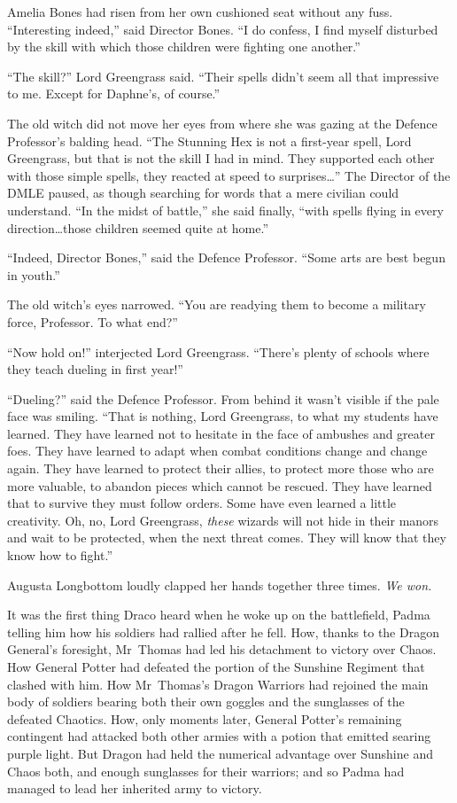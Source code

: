 Amelia Bones had risen from her own cushioned seat without any fuss.
“Interesting indeed,” said Director Bones. “I do confess, I find myself
disturbed by the skill with which those children were fighting one another.”

“The skill?” Lord Greengrass said. “Their spells didn’t seem all that
impressive to me. Except for Daphne’s, of course.”

The old witch did not move her eyes from where she was gazing at the Defence
Professor’s balding head. “The Stunning Hex is not a first-year spell, Lord
Greengrass, but that is not the skill I had in mind. They supported each other
with those simple spells, they reacted at speed to surprises…” The
Director of the DMLE paused, as though searching for words that a mere civilian
could understand. “In the midst of battle,” she said finally, “with spells
flying in every direction…those children seemed quite at home.”

“Indeed, Director Bones,” said the Defence Professor. “Some arts are best begun
in youth.”

The old witch’s eyes narrowed. “You are readying them to become a military
force, Professor. To what end?”

“Now hold on!” interjected Lord Greengrass. “There’s plenty of schools where
they teach dueling in first year!”

“Dueling?” said the Defence Professor. From behind it wasn’t visible if the
pale face was smiling. “That is nothing, Lord Greengrass, to what my students
have learned. They have learned not to hesitate in the face of ambushes and
greater foes. They have learned to adapt when combat conditions change and
change again. They have learned to protect their allies, to protect more those
who are more valuable, to abandon pieces which cannot be rescued. They have
learned that to survive they must follow orders. Some have even learned a
little creativity. Oh, no, Lord Greengrass, \emph{these} wizards will not hide
in their manors and wait to be protected, when the next threat comes. They will
know that they know how to fight.”

Augusta Longbottom loudly clapped her hands together three times.
\later
\emph{We won.}

It was the first thing Draco heard when he woke up on the battlefield, Padma
telling him how his soldiers had rallied after he fell. How, thanks to the
Dragon General’s foresight, Mr~Thomas had led his detachment to victory over
Chaos. How General Potter had defeated the portion of the Sunshine Regiment
that clashed with him. How Mr~Thomas’s Dragon Warriors had rejoined the main
body of soldiers bearing both their own goggles and the sunglasses of the
defeated Chaotics. How, only moments later, General Potter’s remaining
contingent had attacked both other armies with a potion that emitted searing
purple light. But Dragon had held the numerical advantage over Sunshine and
Chaos both, and enough sunglasses for their warriors; and so Padma had managed
to lead her inherited army to victory.

